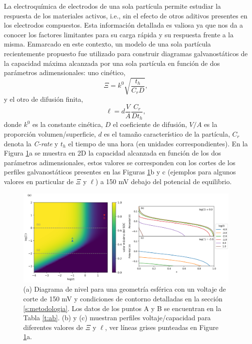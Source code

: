 La electroquímica de electrodos de una sola partícula \cite{ventosa2021, 
heubner2020, takahashi2020, wahab2020, xu2020, tao2019, fukui2011} permite 
estudiar la respuesta  de los materiales activos, i.e., sin el efecto 
de otros aditivos presentes en los electrodos compuestos. Esta información 
detallada es valiosa ya que nos da a conocer los factores limitantes para su 
carga rápida y su respuesta frente a la misma. Enmarcado en este contexto, un 
modelo de una sola partícula recientemente propuesto \cite{gavilan2023} fue 
utilizado para construir diagramas galvanostáticos de la capacidad máxima 
alcanzada por una sola partícula en función de dos parámetros adimensionales: uno
cinético,
\begin{equation}\label{eq:xi}
    \Xi = k^0 \sqrt{\frac{t_h}{C_r D}},
\end{equation}
y el otro de difusión finita,
\begin{equation}\label{eq:ele}
    \ell = d \frac{V}{A} \frac{C_r}{D t_h},
\end{equation}
donde $k^0$ es la constante cinética, $D$ el coeficiente de difusión, $V/A$ es la 
proporción volumen/superficie, $d$ es el tamaño característico de la partícula, 
$C_r$ denota la \textit{C-rate} y $t_h$ el tiempo de una hora (en unidades 
correspondientes). En la Figura \ref{fig:diagnostico}a se muestra en 2D la 
capacidad alcanzada en función de los dos parámetros adimensionales, estos valores 
se corresponden con los cortes de los perfiles galvanostáticos presentes en las
Figuras \ref{fig:diagnostico}b y c (ejemplos para algunos valores en particular 
de $\Xi$ y $\ell$) a 150 mV debajo del potencial de equilibrio.

\begin{figure}[h!]
    \centering
    \includegraphics[width=\textwidth]{FastCharging/un/introduccion/diagnosis-merged.png}
    \caption{(a) Diagrama de nivel para una geometría esférica con un voltaje de 
    corte de 150 mV y condiciones de contorno detalladas en la sección 
    \ref{s:metodologia}. Los datos de los puntos A y B se encuentran en la 
    Tabla \ref{t:ab}. (b) y (c) muestran perfiles voltaje/capacidad para 
    diferentes valores de $\Xi$ y $\ell$, ver líneas grises punteadas en 
    Figure \ref{fig:diagnostico}a.}
    \label{fig:diagnostico}
\end{figure}


